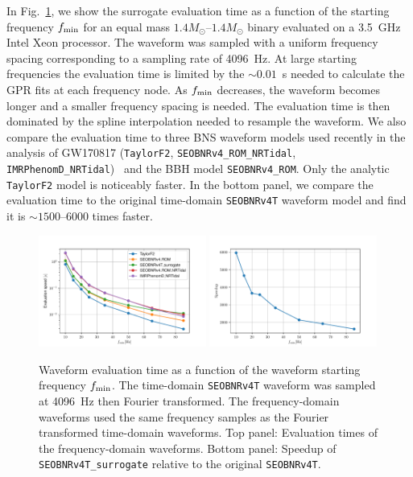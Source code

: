 \documentclass[prd,aps,letter,twocolumn,floatfix,notitlepage,nofootinbib]{revtex4-1}
\begin{document}
In Fig.~\ref{fig:timing}, we show the surrogate evaluation time as a function of the starting frequency $f_{\rm min}$ for an equal mass $1.4M_\odot$--$1.4M_\odot$ binary evaluated on a 3.5~GHz Intel Xeon processor. The waveform was sampled with a uniform frequency spacing corresponding to a sampling rate of 4096~Hz. At large starting frequencies the evaluation time is limited by the $\sim 0.01$~s needed to calculate the GPR fits at each frequency node. As $f_{\rm min}$ decreases, the waveform becomes longer and a smaller frequency spacing is needed. The evaluation time is then dominated by the spline interpolation needed to resample the waveform. We also compare the evaluation time to three BNS waveform models used recently in the analysis of GW170817 (\texttt{TaylorF2}, \texttt{SEOBNRv4\_ROM\_NRTidal}, \texttt{IMRPhenomD\_NRTidal})~\cite{BNSPE} and the BBH model \texttt{SEOBNRv4\_ROM}. Only the analytic \texttt{TaylorF2} model is noticeably faster. In the bottom panel, we compare the evaluation time to the original time-domain \texttt{SEOBNRv4T} waveform model and find it is $\sim 1500$--6000 times faster.

\begin{figure}[htb]
\centering
\includegraphics[width=0.49\textwidth]{../src/TEOB-LAL-implementation/timings/Models_timings_FD_monotonic.pdf}
\includegraphics[width=0.49\textwidth]{../src/TEOB-LAL-implementation/timings/SEOBNRv4T_surrogate_speedup_deltaF_monontonic.pdf}
\caption{Waveform evaluation time as a function of the waveform starting frequency $f_{\rm min}$. The time-domain \texttt{SEOBNRv4T} waveform was sampled at 4096~Hz then Fourier transformed. The frequency-domain waveforms used the same frequency samples as the Fourier transformed time-domain waveforms. Top panel: Evaluation times of the frequency-domain waveforms. Bottom panel: Speedup of \texttt{SEOBNRv4T\_surrogate} relative to the original \texttt{SEOBNRv4T}.}
\label{fig:timing}
\end{figure}
\end{document}

